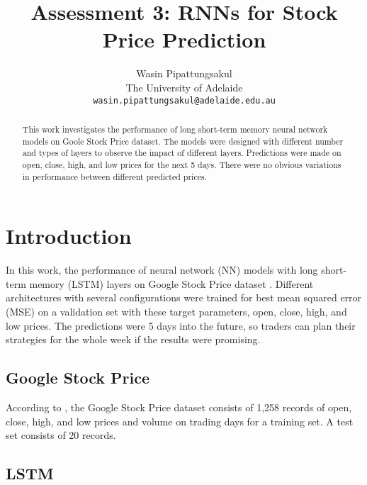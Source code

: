 \documentclass[10pt,twocolumn,letterpaper]{article}
\begin{document}
\title{Assessment 3: RNNs for Stock Price Prediction}

\author{Wasin Pipattungsakul \\
The University of Adelaide \\
{\tt\small wasin.pipattungsakul@adelaide.edu.au}
}

\maketitle

\begin{abstract}
  This work investigates the performance of long short-term memory neural network models on Goole Stock Price
  dataset. The models were designed with different number and types of layers to observe the impact of different
  layers. Predictions were made on open, close, high, and low prices for the next 5 days. There were no obvious
  variations in performance between different predicted prices.
\end{abstract}

\section{Introduction}

In this work, the performance of neural network (NN) models with long short-term memory (LSTM) layers on Google
Stock Price dataset \citep{data}. Different architectures with several configurations were trained for best
mean squared error (MSE) on a validation set with these target parameters, open, close, high, and low prices.
The predictions were 5 days into the future, so traders can plan their strategies for the whole week if the
results were promising.

\subsection{Google Stock Price}

According to \citet{data}, the Google Stock Price dataset consists of 1,258 records of open, close, high, and
low prices and volume on trading days for a training set. A test set consists of 20 records.

\subsection{LSTM}
\end{document}
